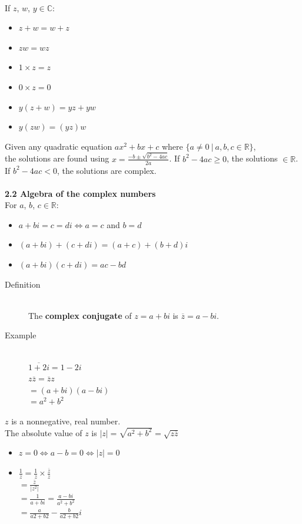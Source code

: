 \documentclass[]{article}
\begin{document}
		\\
		If $z$, $w$, $y\in\mathbb{C}$:
		\begin{itemize}
			\item $z+w=w+z$
			\item $zw=wz$
			\item $1\times z=z$
			\item $0\times z=0$
			\item $y(z+w)=yz+yw$
			\item $y(zw)=(yz)w$
		\end{itemize}
		Given any quadratic equation $ax^2+bx+c$ where $\{a\ne 0\ |\ a, b, c\in\mathbb{R}\}$,\\
		the solutions are found using $x=\frac{-b\pm\sqrt{b^2-4ac}}{2a}$.
		If $b^2-4ac\ge 0$, the solutions $\in\mathbb{R}$.\\
		If $b^2-4ac<0$, the solutions are complex.\\\\
		\large{\bf 2.2 Algebra of the complex numbers}\\
		\normalsize
		For $a$, $b$, $c\in\mathbb{R}$:
		\begin{itemize}
			\item $a+bi=c=di\Leftrightarrow a=c$ and $b=d$
			\item $(a+bi)+(c+di)=(a+c)+(b+d)i$
			\item $(a+bi)(c+di)=ac-bd$
		\end{itemize}
		\begin{description}
			\item[Definition] \hfill\\
				The {\bf complex conjugate} of $z=a+bi$ is $\overline{z}=a-bi$.
			\item[Example]\hfill\\
				$\overline{1+2i}=1-2i$\\
				$z\overline{z}=\overline{z}z$\\
				$=(a+bi)(a-bi)$\\
				$=a^2+b^2$
		\end{description}
		$z$ is a nonnegative, real number.\\
		The absolute value of $z$ is $|z|=\sqrt{a^2+b^2}=\sqrt{z\overline{z}}$
		\begin{itemize}
			\item $z=0\Leftrightarrow a-b=0\Leftrightarrow |z|=0$
			\item $\frac{1}{z}=\frac{1}{z}\times\frac{\overline{z}}{z}$\\
				$=\frac{\overline{z}}{|z^2|}$\\
				$=\frac{1}{a+bi}=\frac{a-bi}{a^2+b^2}$\\
				$=\frac{a}{a2+b2}-\frac{b}{a2+b2}i$\\
		\end{itemize}
\end{document}
